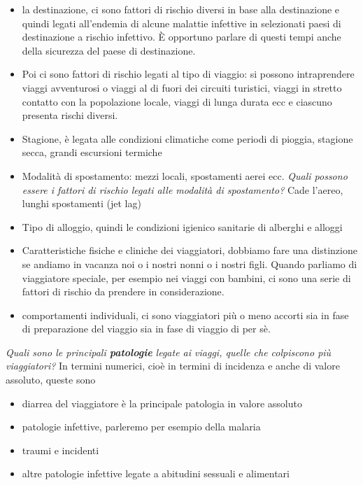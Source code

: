 \begin{itemize}
\item la destinazione, ci sono fattori di rischio diversi in base alla
destinazione e quindi legati all'endemia di alcune malattie infettive in
selezionati paesi di destinazione a rischio infettivo. È opportuno
parlare di questi tempi anche della sicurezza del paese di destinazione.
\item Poi ci sono fattori di rischio legati al tipo di viaggio: si possono
intraprendere viaggi avventurosi o viaggi al di fuori dei circuiti
turistici, viaggi in stretto contatto con la popolazione locale, viaggi
di lunga durata ecc e ciascuno presenta rischi diversi.
\item Stagione, è legata alle condizioni climatiche come periodi di pioggia,
stagione secca, grandi escursioni termiche
\item Modalità di spostamento: mezzi locali, spostamenti aerei ecc.
\emph{Quali possono essere i fattori di rischio legati alle modalità di
spostamento?} Cade l'aereo, lunghi spostamenti (jet lag)
\item Tipo di alloggio, quindi le condizioni igienico sanitarie di alberghi
e alloggi
\item Caratteristiche fisiche e cliniche dei viaggiatori, dobbiamo fare una
distinzione se andiamo in vacanza noi o i nostri nonni o i nostri figli.
Quando parliamo di viaggiatore speciale, per esempio nei viaggi con
bambini, ci sono una serie di fattori di rischio da prendere in
considerazione.
\item comportamenti individuali, ci sono viaggiatori più o meno accorti sia
in fase di preparazione del viaggio sia in fase di viaggio di per sè.
\end{itemize}

\emph{Quali sono le principali \textbf{patologie} legate ai viaggi,
quelle che colpiscono più viaggiatori?} In termini numerici, cioè in
termini di incidenza e anche di valore assoluto, queste sono\\
\begin{itemize}
\item diarrea del viaggiatore è la principale patologia in valore assoluto\\
\item patologie infettive, parleremo per esempio della malaria\\
\item traumi e incidenti\\
\item altre patologie infettive legate a abitudini sessuali e alimentari
\end{itemize}

